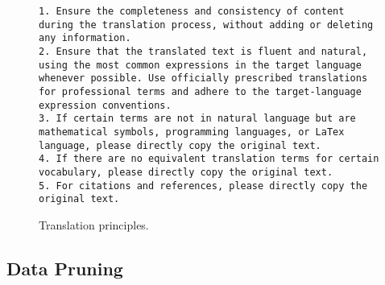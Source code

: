\documentclass[11pt]{article}
\begin{document}
\begin{figure}[h]
\begin{tcolorbox}[colback=blue!2,colframe=blue!50!black]
\small
\texttt{1. Ensure the completeness and consistency of content during the translation process, without adding or deleting any information.\\
2. Ensure that the translated text is fluent and natural, using the most common expressions in the target language whenever possible. Use officially prescribed translations for professional terms and adhere to the target-language expression conventions.\\
3. If certain terms are not in natural language but are mathematical symbols, programming languages, or LaTex language, please directly copy the original text.\\
4. If there are no equivalent translation terms for certain vocabulary, please directly copy the original text.\\
5. For citations and references, please directly copy the original text.}
\end{tcolorbox}
\caption{Translation principles.}
\label{fig:translate_prompt}
\end{figure}

\subsection{Data Pruning}
\label{sec:volume}
\end{document}
